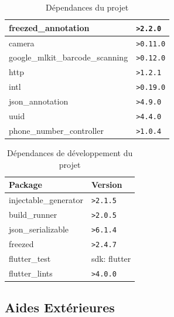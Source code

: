 \begin{table}[h!]
\begin{tabular}{|m{}|m{}|}
        freezed\_annotation              & \texttt{>2.2.0}  \\ \hline
        camera                           & \texttt{>0.11.0} \\ \hline
        google\_mlkit\_barcode\_scanning & \texttt{>0.12.0} \\ \hline
        http                             & \texttt{>1.2.1}  \\ \hline
        intl                             & \texttt{>0.19.0} \\ \hline
        json\_annotation                 & \texttt{>4.9.0}  \\ \hline
        uuid                             & \texttt{>4.4.0}  \\ \hline
        phone\_number\_controller        & \texttt{>1.0.4}  \\ \hline
    \end{tabular}
    \caption{Dépendances du projet}
    \label{table:dependencies}
\end{table}

\begin{table}[h!]
    \centering
    \begin{tabular}{|m{}|m{}|}
        \hline
        \textbf{Package}      & \textbf{Version} \\ \hline
        injectable\_generator & \texttt{>2.1.5}  \\ \hline
        build\_runner         & \texttt{>2.0.5}  \\ \hline
        json\_serializable    & \texttt{>6.1.4}  \\ \hline
        freezed               & \texttt{>2.4.7}  \\ \hline
        flutter\_test         & sdk: flutter     \\ \hline
        flutter\_lints        & \texttt{>4.0.0}  \\ \hline
    \end{tabular}
    \caption{Dépendances de développement du projet}
    \label{table:dev-dependencies}
\end{table}


\subsection{Aides Extérieures}

